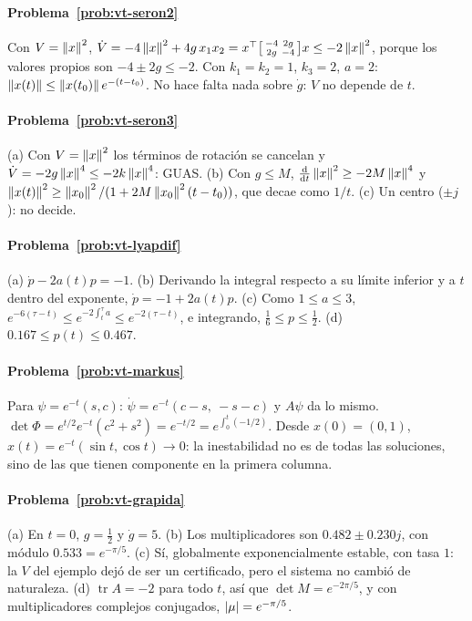 \paragraph{Problema~\ref{prob:vt-seron2}}
Con $V=\left\lVert x\right\rVert^2$, $\dot V=-4\left\lVert x\right\rVert^2+4g\,x_1x_2=x^{\top}\bigl[\begin{smallmatrix}-4&2g\\2g&-4\end{smallmatrix}\bigr]x\le-2\left\lVert x\right\rVert^2$, porque los valores propios son $-4\pm2g\le-2$. Con $k_1=k_2=1$, $k_3=2$, $a=2$: $\left\lVert x(t)\right\rVert\le\left\lVert x(t_0)\right\rVert e^{-(t-t_0)}$. No hace falta nada sobre $\dot g$: $V$ no depende de $t$.

\paragraph{Problema~\ref{prob:vt-seron3}}
(a) Con $V=\left\lVert x\right\rVert^2$ los términos de rotación se cancelan y $\dot V=-2g\left\lVert x\right\rVert^4\le-2k\left\lVert x\right\rVert^4$: GUAS. (b) Con $g\le M$, $\frac{\mathrm{d}}{\mathrm{d} t}\left\lVert x\right\rVert^2\ge-2M\left\lVert x\right\rVert^4$ y $\left\lVert x(t)\right\rVert^2\ge\left\lVert x_0\right\rVert^2/(1+2M\left\lVert x_0\right\rVert^2(t-t_0))$, que decae como $1/t$. (c) Un centro ($\pm j$): no decide.

\paragraph{Problema~\ref{prob:vt-lyapdif}}
(a) $\dot p-2a(t)p=-1$. (b) Derivando la integral respecto a su límite inferior y a $t$ dentro del exponente, $\dot p=-1+2a(t)p$. (c) Como $1\le a\le3$, $e^{-6(\tau-t)}\le e^{-2\int_t^\tau a}\le e^{-2(\tau-t)}$, e integrando, $\tfrac16\le p\le\tfrac12$. (d) $0.167\le p(t)\le0.467$.

\paragraph{Problema~\ref{prob:vt-markus}}
Para $\psi=e^{-t}(s,c)$: $\dot\psi=e^{-t}(c-s,\ -s-c)$ y $A\psi$ da lo mismo. $\det\Phi=e^{t/2}e^{-t}(c^2+s^2)=e^{-t/2}=e^{\int_0^t(-1/2)}$. Desde $x(0)=(0,1)$, $x(t)=e^{-t}(\sin t,\cos t)\to0$: la inestabilidad no es de todas las soluciones, sino de las que tienen componente en la primera columna.

\paragraph{Problema~\ref{prob:vt-grapida}}
(a) En $t=0$, $g=\tfrac12$ y $\dot g=5$. (b) Los multiplicadores son $0.482\pm0.230j$, con módulo $0.533=e^{-\pi/5}$. (c) Sí, globalmente exponencialmente estable, con tasa $1$: la $V$ del ejemplo dejó de ser un certificado, pero el sistema no cambió de naturaleza. (d) $\operatorname{tr}A=-2$ para todo $t$, así que $\det M=e^{-2\pi/5}$, y con multiplicadores complejos conjugados, $\left\lvert \mu\right\rvert=e^{-\pi/5}$.

